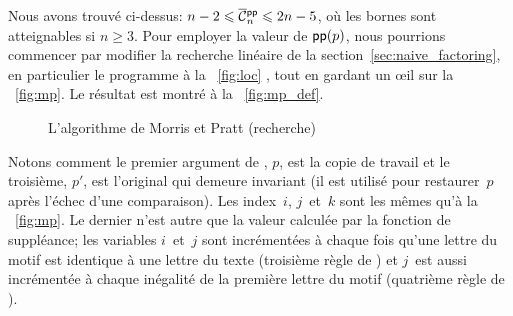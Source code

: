 \vspace*{-20pt}


Nous avons trouvé ci-dessus: \(n-2 \leqslant \OC{\fun{pp}}{n}
\leqslant 2n - 5\), où les bornes sont atteignables si \(n \geqslant
3\). Pour employer la valeur de \(\textsf{pp}(p)\), nous pourrions
commencer par modifier la recherche linéaire de la
section~\ref{sec:naive_factoring}, en particulier le programme à la
\fig~\ref{fig:loc} , tout en gardant un œil sur
la \fig~\vref{fig:mp}. Le résultat est montré à la
\fig~\vref{fig:mp_def}.
\begin{figure}[b]
\centering
\abovedisplayskip=0pt
\belowdisplayskip=0pt
\caption{L'algorithme de Morris et Pratt (recherche)}
\label{fig:mp_def}
\end{figure}
Notons comment le premier argument de ,
\(p\), est la copie de travail et le troisième, \(p'\), est l'original
qui demeure invariant (il est utilisé pour restaurer~\(p\) après
l'échec d'une comparaison). Les index~\(i\), \(j\)~et~\(k\) sont les
mêmes qu'à la \fig~\vref{fig:mp}. Le dernier n'est autre que la valeur
calculée par la fonction de suppléance; les variables \(i\)~et~\(j\)
sont incrémentées à chaque fois qu'une lettre du motif est identique à
une lettre du texte (troisième règle de ) et \(j\)~est aussi
incrémentée à chaque inégalité de la première lettre du motif
(quatrième règle de ).


